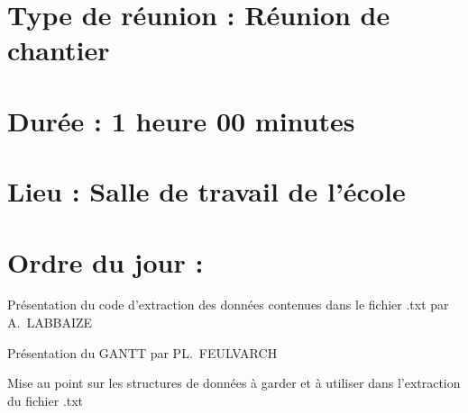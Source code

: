 \documentclass[11pt]{meetingmins}
\begin{document}
\maketitle
\section{Type de réunion : \textnormal{Réunion de chantier} }

\section{Durée : \textnormal{1 heure 00 minutes} }
\section{Lieu : \textnormal{Salle de travail de l'école} }


\section{}
\section{Ordre du jour :}
\begin{hiddenitems}
\item
Présentation du code d'extraction des données contenues dans le fichier .txt par A.~LABBAIZE
\item
Présentation du GANTT par PL.~FEULVARCH
\item 
Mise au point sur les structures de données à garder et à utiliser dans l'extraction du fichier .txt 
\end{hiddenitems}

\end{document}
